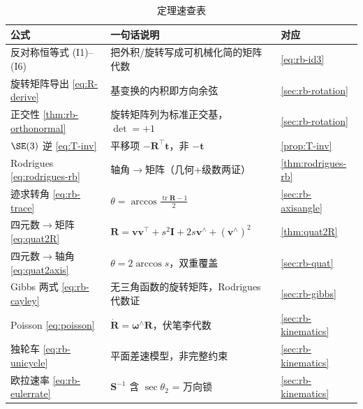 \begin{table}[H]\centering\small
\caption{定理速查表}
\begin{tabular}{lll}
\toprule
公式 & 一句话说明 & 对应 \\
\midrule
反对称恒等式 (I1)--(I6) & 把外积/旋转写成可机械化简的矩阵代数 & \cref{eq:rb-id3} \\
旋转矩阵导出 \cref{eq:R-derive} & 基变换的内积即方向余弦 & \cref{sec:rb-rotation} \\
正交性 \cref{thm:rb-orthonormal} & 旋转矩阵列为标准正交基，$\det=+1$ & \cref{sec:rb-rotation}\\
$\SE(3)$ 逆 \cref{eq:T-inv} & 平移项 $-\mathbf{R}^\top\mathbf{t}$，非 $-\mathbf{t}$ & \cref{prop:T-inv} \\
Rodrigues \cref{eq:rodrigues-rb} & 轴角$\to$矩阵（几何+级数两证） & \cref{thm:rodrigues-rb} \\
迹求转角 \cref{eq:rb-trace} & $\theta=\arccos\frac{\operatorname{tr}\mathbf{R}-1}{2}$ & \cref{sec:rb-axisangle} \\
四元数$\to$矩阵 \cref{eq:quat2R} & $\mathbf{R}=\mathbf{v}\mathbf{v}^\top+s^2\mathbf{I}+2s\mathbf{v}^\wedge+(\mathbf{v}^\wedge)^2$ & \cref{thm:quat2R} \\
四元数$\to$轴角 \cref{eq:quat2axis} & $\theta=2\arccos s$，双重覆盖 & \cref{sec:rb-quat} \\
Gibbs 两式 \cref{eq:rb-cayley} & 无三角函数的旋转矩阵，Rodrigues 代数证 & \cref{sec:rb-gibbs} \\
Poisson \cref{eq:poisson} & $\dot{\mathbf{R}}=\boldsymbol{\omega}^\wedge\mathbf{R}$，伏笔李代数 & \cref{sec:rb-kinematics} \\
独轮车 \cref{eq:rb-unicycle} & 平面差速模型，非完整约束 & \cref{sec:rb-kinematics} \\
欧拉速率 \cref{eq:rb-eulerrate} & $\mathbf{S}^{-1}$ 含 $\sec\theta_2$ = 万向锁 & \cref{sec:rb-kinematics} \\
\bottomrule
\end{tabular}
\end{table}

